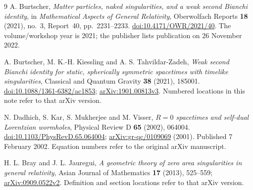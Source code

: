 \documentclass[11pt]{article}
\begin{document}
\begin{thebibliography}{9}
A. Burtscher, \emph{Matter particles, naked singularities, and a weak second
Bianchi identity}, in \emph{Mathematical Aspects of General Relativity},
Oberwolfach Reports \textbf{18} (2021), no.~3, Report~40, pp.~2231--2233.
\href{https://doi.org/10.4171/OWR/2021/40}{doi:10.4171/OWR/2021/40}.
The volume/workshop year is 2021; the publisher lists publication on
26 November 2022.

A. Burtscher, M. K.-H. Kiessling and A. S. Tahvildar-Zadeh,
\emph{Weak second Bianchi identity for static, spherically symmetric
spacetimes with timelike singularities}, Classical and Quantum Gravity
\textbf{38} (2021), 185001.
\href{https://doi.org/10.1088/1361-6382/ac1853}{doi:10.1088/1361-6382/ac1853};
\href{https://arxiv.org/abs/1901.00813v3}{arXiv:1901.00813v3}.
Numbered locations in this note refer to that arXiv version.

N. Dadhich, S. Kar, S. Mukherjee and M. Visser,
\emph{$R=0$ spacetimes and self-dual Lorentzian wormholes},
Physical Review D \textbf{65} (2002), 064004.
\href{https://doi.org/10.1103/PhysRevD.65.064004}{doi:10.1103/PhysRevD.65.064004};
\href{https://arxiv.org/abs/gr-qc/0109069}{arXiv:gr-qc/0109069} (2001).
Published 7 February 2002. Equation numbers refer to the original arXiv
manuscript.

H. L. Bray and J. L. Jauregui, \emph{A geometric theory of zero area
singularities in general relativity}, Asian Journal of Mathematics
\textbf{17} (2013), 525--559;
\href{https://arxiv.org/abs/0909.0522v2}{arXiv:0909.0522v2}.
Definition and section locations refer to that arXiv version.
\end{thebibliography}
\end{document}
